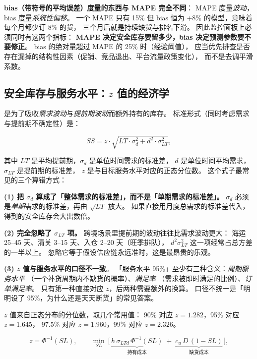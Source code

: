 \textbf{bias（带符号的平均误差）度量的东西与 MAPE 完全不同}：
MAPE 度量\emph{波动}，bias 度量\emph{系统性偏移}。
一个 MAPE 只有 15\% 但 bias 恒为 +8\% 的模型，意味着每个月都少订 8\% 的货，
三个月后就是持续缺货与排名下滑。
因此监控面板上必须同时有这两个指标：
\textbf{MAPE 决定安全库存要留多少，bias 决定预测参数要不要修正}。
bias 的绝对量超过 MAPE 的 25\% 时（经验阈值），
应当优先排查是否存在漏掉的结构性因素（促销、竞品退出、平台流量政策变化），
而不是去调平滑系数。

\subsection{安全库存与服务水平：$z$ 值的经济学}

 是为了吸收\emph{需求波动}与\emph{提前期波动}而额外持有的库存。
标准形式（同时考虑需求与提前期不确定性）是：

\begin{equation}
SS = z \cdot \sqrt{LT \cdot \sigma_d^2 + d^2 \cdot \sigma_{LT}^2},
\label{eq:ss}
\end{equation}

其中 $LT$ 是平均提前期，$\sigma_d$ 是单位时间需求的标准差，
$d$ 是单位时间平均需求，$\sigma_{LT}$ 是提前期的标准差，
$z$ 是与目标服务水平对应的正态分位数。
这个式子最常见的三个算错方式：

\textbf{(1) 把 $\sigma_d$ 算成了「整体需求的标准差」，而不是「单期需求的标准差」。}
$\sigma_d$ 必须是\emph{单期}需求的标准差，再由 $\sqrt{LT}$ 放大。
如果直接用月度总需求的标准差代入，得到的安全库存会大出数倍。

\textbf{(2) 完全忽略了 $\sigma_{LT}$ 项。}
跨境场景里提前期的波动往往比需求波动更大：
海运 25--45 天、清关 3--15 天、入仓 2--20 天（旺季排队），
$d^2\sigma_{LT}^2$ 这一项经常占总方差的一半以上。
忽略它等于假设供应链永远准时，这是最昂贵的乐观。

\textbf{(3) $z$ 值与服务水平的口径不一致}。
「服务水平 95\%」至少有三种含义：\emph{周期服务水平}
（一个补货周期内不缺货的概率）、\emph{满足率}
（需求被即时满足的比例）、\emph{订单满足率}。
只有第一种直接对应 $z$，后两种需要额外的换算。
口径不统一是「明明设了 95\%，为什么还是天天断货」的常见答案。

$z$ 值来自正态分布的分位数，取几个常用值：
90\% 对应 $z = 1.282$，95\% 对应 $z = 1.645$，
97.5\% 对应 $z = 1.960$，99\% 对应 $z = 2.326$。

\begin{equation}
z = \Phi^{-1}(SL),
\qquad
\min_{SL}\ \Big[\, \underbrace{h\,\sigma_{LTd}\,\Phi^{-1}(SL)}_{\text{持有成本}} \;+\; \underbrace{c_u\, D\,(1-SL)}_{\text{缺货成本}} \,\Big],
\label{eq:zservice}
\end{equation}

